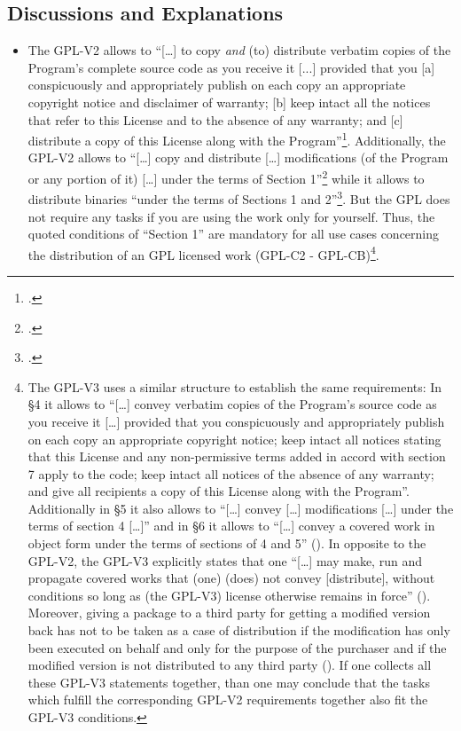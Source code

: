 \subsection{Discussions and Explanations}

\begin{itemize}
  
  \item The GPL-V2 allows to \enquote{[\ldots] to copy \emph{and} (to)
  distribute verbatim copies of the Program's complete source code as you
  receive it [...] provided that you [a] conspicuously and appropriately publish
  on each copy an appropriate copyright notice and disclaimer of warranty; [b]
  keep intact all the notices that refer to this License and to the absence of
  any warranty; and [c] distribute a copy of this License along with the
  Program}\footcite[cf.][\nopage wp.\ §1, emphasizes by
  KR]{Gpl20OsiLicense1991a}. Additionally, the GPL-V2 allows to
  \enquote{[\ldots] copy and distribute [\ldots] modifications (of the Program
  or any portion of it) [\ldots] under the terms of Section
  1}\footcite[cf.][\nopage wp.\ §2]{Gpl20OsiLicense1991a} while it allows to
  distribute binaries \enquote{under the terms of Sections 1 and
  2}\footcite[cf.][\nopage wp.\ §4]{Gpl20OsiLicense1991a}. But the GPL does not
  require any tasks if you are using the work only for yourself. Thus, the
  quoted conditions of \enquote{Section 1} are mandatory for all use cases
  concerning the distribution of an GPL licensed work (GPL-C2 - GPL-CB)\footnote{
  \label{Gpl3ConditionsDistri}
  The GPL-V3 uses a similar structure to establish the same requirements:
  In §4 it allows to \enquote{[\ldots] convey verbatim copies of the Program's
  source code as you receive it [\ldots] provided that you conspicuously and
  appropriately publish on each copy an appropriate copyright notice; keep
  intact all notices stating that this License and any non-permissive terms
  added in accord with section 7 apply to the code; keep intact all notices of
  the absence of any warranty; and give all recipients a copy of this License
  along with the Program}. Additionally in §5 it also allows to
  \enquote{[\ldots] convey [\ldots] modifications [\ldots] under the terms of
  section 4 [\ldots]} and in §6 it allows to \enquote{[\ldots] convey a covered
  work in object form under the terms of sections of 4 and 5}
  (\cite[cf.][\nopage wp.\ §4, §5, §6]{Gpl30OsiLicense2007a}). In opposite to
  the GPL-V2, the GPL-V3 explicitly states that one \enquote{[\ldots] may
  make, run and propagate covered works that (one) (does) not convey
  [distribute], without conditions so long as (the GPL-V3) license otherwise
  remains in force} (\cite[cf.][\nopage wp.\ §2]{Gpl30OsiLicense2007a}).
  Moreover, giving a package to a third party for getting a modified version
  back has not to be taken as a case of distribution if the modification has
  only been executed on behalf and only for the purpose of the purchaser and if
  the modified version is not distributed to any third party (\cite[cf.][\nopage
  wp.\ §2]{Gpl30OsiLicense2007a}). If one collects all these GPL-V3 statements
  together, than one may conclude that the tasks which fulfill the corresponding
  GPL-V2 requirements together also fit the GPL-V3 conditions.}.
  

\end{itemize}
